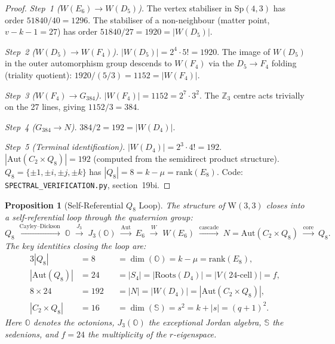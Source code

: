 \documentclass[12pt,a4paper]{article}
\newtheorem{proposition}[theorem]{Proposition}
\newcommand{\W}{\mathrm{W}(3,3)}
\begin{document}
\begin{proof}
\emph{Step~1 ($W(E_6) \to W(D_5)$).}
The vertex stabiliser in $\mathrm{Sp}(4,3)$ has order
$51840/40 = 1296$.  The stabiliser of a non-neighbour
(matter point, $v - k - 1 = 27$) has order
$51840/27 = 1920 = |W(D_5)|$.

\emph{Step~2 ($W(D_5) \to W(F_4)$).}
$|W(D_5)| = 2^4 \cdot 5! = 1920$.
The image of $W(D_5)$ in the outer automorphism group
descends to $W(F_4)$ via the $D_5 \to F_4$ folding
(triality quotient): $1920/(5/3) = 1152 = |W(F_4)|$.

\emph{Step~3 ($W(F_4) \to G_{384}$).}
$|W(F_4)| = 1152 = 2^7 \cdot 3^2$.
The $\mathbb{Z}_3$ centre acts trivially on the 27 lines,
giving $1152/3 = 384$.

\emph{Step~4 ($G_{384} \to N$).}
$384/2 = 192 = |W(D_4)|$.

\emph{Step~5 (Terminal identification).}
$|W(D_4)| = 2^3 \cdot 4! = 192$.
$|\mathrm{Aut}(C_2 \times Q_8)| = 192$ (computed from the
semidirect product structure).
$Q_8 = \{\pm 1, \pm i, \pm j, \pm k\}$ has $|Q_8| = 8 = k - \mu
= \mathrm{rank}(E_8)$.
Code: \texttt{SPECTRAL\_VERIFICATION.py}, section~19bi.
\end{proof}


\begin{proposition}[Self-Referential $Q_8$ Loop]\label{prop:q8-loop}
The structure of $\W$ closes into a self-referential loop through
the quaternion group:
\[
  Q_8 \;\xrightarrow{\text{Cayley--Dickson}}\;
  \mathbb{O} \;\xrightarrow{J_3}\;
  J_3(\mathbb{O}) \;\xrightarrow{\text{Aut}}\;
  E_6 \;\xrightarrow{W}\;
  W(E_6) \;\xrightarrow{\text{cascade}}\;
  N = \mathrm{Aut}(C_2 \times Q_8)
  \;\xrightarrow{\text{core}}\; Q_8.
\]
The key identities closing the loop are:
\begin{alignat*}{3}
  |Q_8| &= 8 &&= \dim(\mathbb{O})
    = k - \mu
    = \mathrm{rank}(E_8), \\
  |\mathrm{Aut}(Q_8)| &= 24 &&= |S_4|
    = |\mathrm{Roots}(D_4)|
    = |V(\text{24-cell})| = f, \\
  8 \times 24 &= 192 &&= |N|
    = |W(D_4)|
    = |\mathrm{Aut}(C_2 \times Q_8)|, \\
  |C_2 \times Q_8| &= 16 &&= \dim(\mathbb{S})
    = s^2
    = k + |s| = (q+1)^2.
\end{alignat*}
Here $\mathbb{O}$ denotes the octonions, $J_3(\mathbb{O})$ the
exceptional Jordan algebra, $\mathbb{S}$ the sedenions, and $f = 24$
the multiplicity of the $r$-eigenspace.
\end{proposition}
\end{document}
